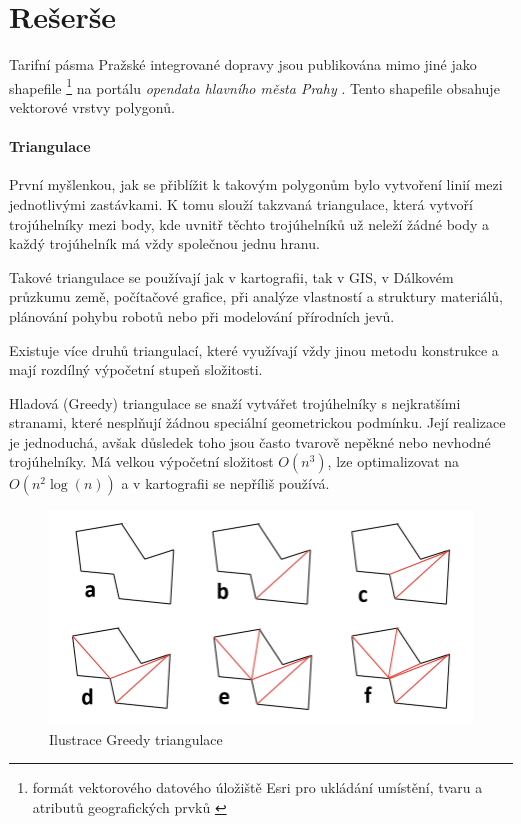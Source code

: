 \chapter{Rešerše}
\label{0-reserse}

Tarifní pásma Pražské integrované dopravy jsou publikována mimo jiné jako shapefile 
\footnote{formát vektorového datového úložiště Esri pro ukládání umístění,
tvaru a atributů geografic\-kých prvků \cite{shapefile}}
na portálu \textit{opendata hlavního města Prahy} \cite{opendata}. Tento shapefile
obsahuje vektorové vrstvy polygonů.

\subsubsection{Triangulace}
\label{triangulace}
                
První myšlenkou, jak se přiblížit k takovým polygonům bylo vytvoření linií mezi jednotlivými zastávkami.
K tomu slouží takzvaná triangulace, která vytvoří troj\-úhelníky mezi body, kde uvnitř těchto trojúhelníků  
už neleží žádné body a každý trojúhelník má vždy společnou jednu hranu. 

Takové triangulace se používají jak v kartografii, tak v GIS, v Dálkovém průzkumu země,
počítačové grafice, při analýze vlastností a struktury materiálů, plánování pohybu robotů
nebo při modelování přírodních jevů. \cite{bayer-delaunay}

Existuje více druhů triangulací, které využívají vždy jinou metodu konstrukce
a mají rozdílný výpočetní stupeň složitosti. 

Hladová (Greedy) triangulace se snaží vytvářet trojúhelníky s nejkratšími stranami,
které nesplňují žádnou speciální geometrickou podmínku. Její realizace je jednoduchá,
avšak důsledek toho jsou často tvarově nepěkné nebo nevhodné trojúhelníky. Má velkou výpočetní
složitost \(O(n^3)\), lze optimalizovat na \(O(n^2 \log(n))\) a v kartografii se 
nepříliš používá. \cite{vanicek}

\begin{figure}[H] \centering
    \includegraphics[width=400pt]{./pictures/triangulace-greedy.png}
    \caption[Ilustrace Greedy triangulace]{Ilustrace Greedy triangulace \cite{triangulace-greedy}}
	\label{fig:triangulace-greedy}              
\end{figure}

